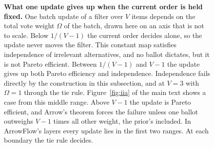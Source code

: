 \begin{figure}[!htbp]
\centering
{}
\caption{\textbf{What one update gives up when the current order is held fixed.} One batch update of a filter over $V$ items depends on the total vote weight $\Omega$ of the batch, drawn here on an axis that is not to scale. Below $1/(V-1)$ the current order decides alone, so the update never moves the filter. This constant map satisfies independence of irrelevant alternatives, and no ballot dictates, but it is not Pareto efficient. Between $1/(V-1)$ and $V-1$ the update gives up both Pareto efficiency and independence. Independence fails directly by the construction in this subsection, and at $V=3$ with $\Omega=1$ through the tie rule. Figure~\ref{fig:iia} of the main text shows a case from this middle range. Above $V-1$ the update is Pareto efficient, and Arrow's theorem forces the failure unless one ballot outweighs $V-1$ times all other weight, the prior's included. In ArrowFlow's layers every update lies in the first two ranges. At each boundary the tie rule decides.}
\label{fig:s-weight-regimes}
\end{figure}
